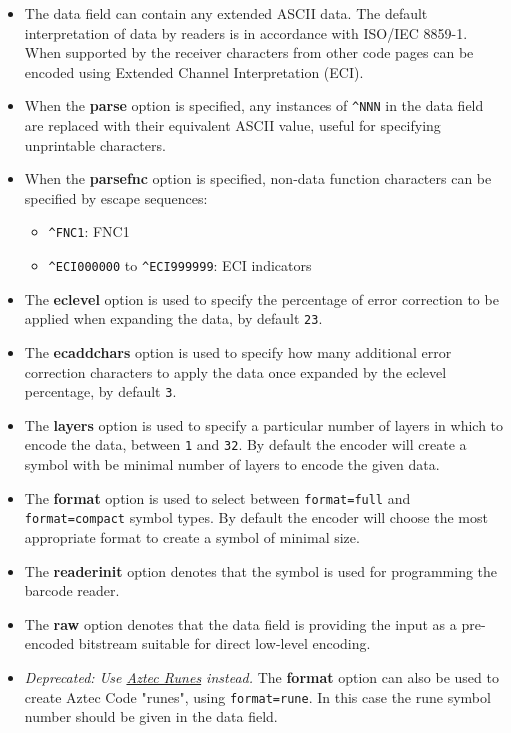 \begin{itemize}
\tightlist
\item
  The data field can contain any extended ASCII data. The default
  interpretation of data by readers is in accordance with ISO/IEC
  8859-1. When supported by the receiver characters from other code
  pages can be encoded using Extended Channel Interpretation (ECI).
\item
  When the \textbf{parse} option is specified, any instances of
  \texttt{\^{}NNN} in the data field are replaced with their equivalent
  ASCII value, useful for specifying unprintable characters.
\item
  When the \textbf{parsefnc} option is specified, non-data function
  characters can be specified by escape sequences:

  \begin{itemize}
  \tightlist
  \item
    \texttt{\^{}FNC1}: FNC1
  \item
    \texttt{\^{}ECI000000} to \texttt{\^{}ECI999999}: ECI indicators
  \end{itemize}
\item
  The \textbf{eclevel} option is used to specify the percentage of error
  correction to be applied when expanding the data, by default
  \texttt{23}.
\item
  The \textbf{ecaddchars} option is used to specify how many additional
  error correction characters to apply the data once expanded by the
  eclevel percentage, by default \texttt{3}.
\item
  The \textbf{layers} option is used to specify a particular number of
  layers in which to encode the data, between \texttt{1} and
  \texttt{32}. By default the encoder will create a symbol with be
  minimal number of layers to encode the given data.
\item
  The \textbf{format} option is used to select between
  \texttt{format=full} and \texttt{format=compact} symbol types. By
  default the encoder will choose the most appropriate format to create
  a symbol of minimal size.
\item
  The \textbf{readerinit} option denotes that the symbol is used for
  programming the barcode reader.
\item
  The \textbf{raw} option denotes that the data field is providing the
  input as a pre-encoded bitstream suitable for direct low-level
  encoding.
\item
  \emph{Deprecated: Use \protect\hyperlink{aztec-runes}{Aztec Runes}
  instead.} The \textbf{format} option can also be used to create Aztec
  Code "runes", using \texttt{format=rune}. In this case the rune symbol
  number should be given in the data field.
\end{itemize}

